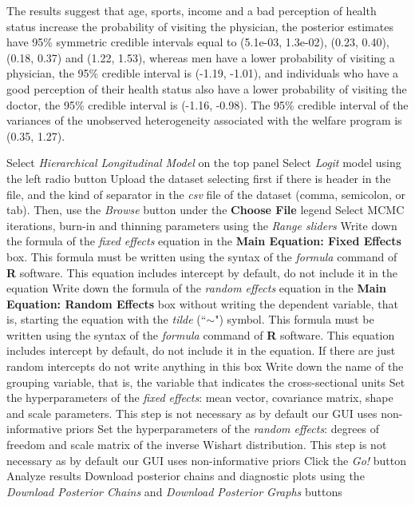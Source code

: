 The results suggest that age, sports, income and a bad perception of health status increase the probability of visiting the physician, the posterior estimates have 95\% symmetric credible intervals equal to (5.1e-03, 1.3e-02), (0.23, 0.40), (0.18, 0.37) and (1.22, 1.53), whereas men have a lower probability of visiting a physician, the 95\% credible interval is (-1.19, -1.01), and individuals who have a good perception of their health status also have a lower probability of visiting the doctor, the 95\% credible interval is (-1.16, -0.98). The 95\% credible interval of the variances of the unobserved heterogeneity associated with the welfare program is (0.35, 1.27).

\begin{algorithm}[h!]
	\caption{Hierarchical longitudinal logit models}\label{alg:HLogit}
	\begin{algorithmic}[1]  		 			
		\State Select \textit{Hierarchical Longitudinal Model} on the top panel
		\State Select \textit{Logit} model using the left radio button
		\State Upload the dataset selecting first if there is header in the file, and the kind of separator in the \textit{csv} file of the dataset (comma, semicolon, or tab). Then, use the \textit{Browse} button under the \textbf{Choose File} legend
		\State Select MCMC iterations, burn-in and thinning parameters using the \textit{Range sliders}
		\State Write down the formula of the \textit{fixed effects} equation in the \textbf{Main Equation: Fixed Effects} box. This formula must be written using the syntax of the \textit{formula} command of \textbf{R} software. This equation includes intercept by default, do not include it in the equation
		\State Write down the formula of the \textit{random effects} equation in the \textbf{Main Equation: Random Effects} box without writing the dependent variable, that is, starting the equation with the \textit{tilde} (``$\sim$") symbol. This formula must be written using the syntax of the \textit{formula} command of \textbf{R} software. This equation includes intercept by default, do not include it in the equation. If there are just random intercepts do not write anything in this box
		\State Write down the name of the grouping variable, that is, the variable that indicates the cross-sectional units 
		\State Set the hyperparameters of the \textit{fixed effects}: mean vector, covariance matrix, shape and scale parameters. This step is not necessary as by default our GUI uses non-informative priors
		\State Set the hyperparameters of the \textit{random effects}: degrees of freedom and scale matrix of the inverse Wishart distribution. This step is not necessary as by default our GUI uses non-informative priors
		\State Click the \textit{Go!} button
		\State Analyze results
		\State Download posterior chains and diagnostic plots using the \textit{Download Posterior Chains} and \textit{Download Posterior Graphs} buttons
	\end{algorithmic} 
\end{algorithm}

